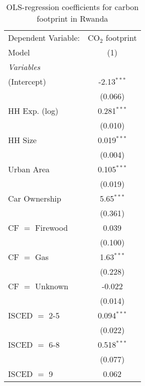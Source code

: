 
\begin{table}[htbp!]
   \centering
   \small
   \begin{adjustbox}{width = 1\textwidth, max height = 0.95\textheight, center}
      \begin{threeparttable}[b]
         \caption{\label{tab:OLS_2_RWA} OLS-regression coefficients for carbon footprint in Rwanda}
         \begin{tabular}{lc}
            \tabularnewline \midrule \midrule
            Dependent Variable: & CO$_{2}$ footprint\\  
            Model               & (1)\\  
            \midrule
            \emph{Variables}\\
            (Intercept)         & -2.13$^{***}$\\   
                                & (0.066)\\   
            HH Exp. (log)       & 0.281$^{***}$\\   
                                & (0.010)\\   
            HH Size             & 0.019$^{***}$\\   
                                & (0.004)\\   
            Urban Area          & 0.105$^{***}$\\   
                                & (0.019)\\   
            Car Ownership       & 5.65$^{***}$\\   
                                & (0.361)\\   
            CF $=$ Firewood     & 0.039\\   
                                & (0.100)\\   
            CF $=$ Gas          & 1.63$^{***}$\\   
                                & (0.228)\\   
            CF $=$ Unknown      & -0.022\\   
                                & (0.014)\\   
            ISCED $=$ 2-5       & 0.094$^{***}$\\   
                                & (0.022)\\   
            ISCED $=$ 6-8       & 0.518$^{***}$\\   
                                & (0.077)\\   
            ISCED $=$ 9         & 0.062\\   

\end{tabular}
\end{threeparttable}
\end{adjustbox}
\end{table}
